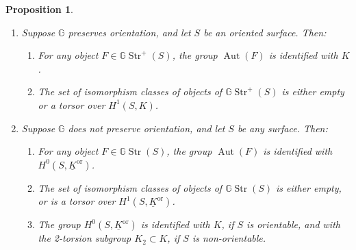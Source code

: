 \documentclass[english,11pt,leqno]{article}
\def\GG{\mathbb{G}}
\def\Aut{\operatorname{Aut}\nolimits}
\def\on{\operatorname}
\def\Gstr{\GG\on{Str}}
\def\orr{{\on{or}}}
\newtheorem{prop}[thm]{Proposition}
\theoremstyle{definition}
\theoremstyle{remark}
\numberwithin{equation}{section}
\begin{document}
\begin{prop}\label{prop:G-structures}
\begin{enumerate}
\item[(a)] Suppose $\GG$ preserves orientation, and let $S$ be an oriented surface. Then:
\begin{enumerate}
\item[(a1)] For any object $F\in\Gstr^+(S)$, the group $\Aut(F)$ is identified with $K$.

\item[(a2)] The set of isomorphism classes of objects of $\Gstr^+(S)$ is either empty or a torsor
over $H^1(S,K)$.
\end{enumerate}

\item[(b)] Suppose $\GG$ does not preserve orientation, and let  $S$
be any surface. Then: 

\begin{enumerate}
\item[(b1)] For  any object $F\in\Gstr(S)$, the group $\Aut(F)$ is identified with $H^0(S, \underline K^\orr)$. 

\item[(b2)] The set of isomorphism classes of objects of $\Gstr(S)$ is either empty, or is a torsor
over $H^1(S,\underline K^\orr)$.

\item[(b3)] The group  $H^0(S, \underline K^\orr)$ is identified with $K$, if $S$ is orientable, and with
the 2-torsion subgroup $K_2\subset K$, if $S$ is non-orientable. 
\end{enumerate}
\end{enumerate}
\end{prop}
\end{document}
